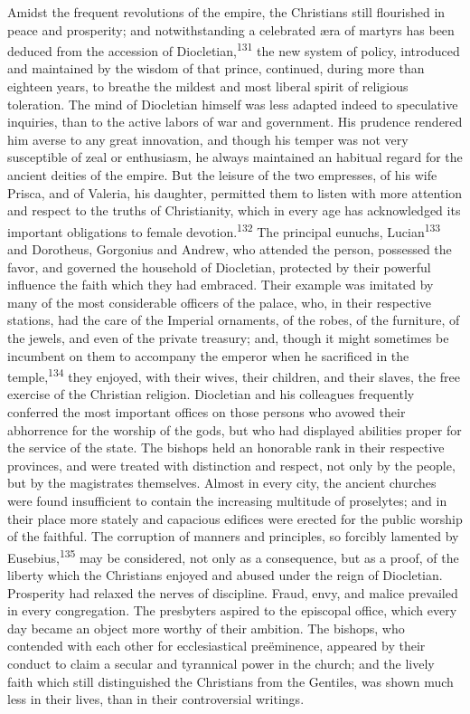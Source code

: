 Amidst the frequent revolutions of the empire, the Christians
still flourished in peace and prosperity; and notwithstanding a
celebrated æra of martyrs has been deduced from the accession of
Diocletian,\textsuperscript{131} the new system of policy, introduced and
maintained by the wisdom of that prince, continued, during more
than eighteen years, to breathe the mildest and most liberal
spirit of religious toleration. The mind of Diocletian himself
was less adapted indeed to speculative inquiries, than to the
active labors of war and government. His prudence rendered him
averse to any great innovation, and though his temper was not
very susceptible of zeal or enthusiasm, he always maintained an
habitual regard for the ancient deities of the empire. But the
leisure of the two empresses, of his wife Prisca, and of Valeria,
his daughter, permitted them to listen with more attention and
respect to the truths of Christianity, which in every age has
acknowledged its important obligations to female devotion.\textsuperscript{132}
The principal eunuchs, Lucian\textsuperscript{133} and Dorotheus, Gorgonius and
Andrew, who attended the person, possessed the favor, and
governed the household of Diocletian, protected by their powerful
influence the faith which they had embraced. Their example was
imitated by many of the most considerable officers of the palace,
who, in their respective stations, had the care of the Imperial
ornaments, of the robes, of the furniture, of the jewels, and
even of the private treasury; and, though it might sometimes be
incumbent on them to accompany the emperor when he sacrificed in
the temple,\textsuperscript{134} they enjoyed, with their wives, their children,
and their slaves, the free exercise of the Christian religion.
Diocletian and his colleagues frequently conferred the most
important offices on those persons who avowed their abhorrence
for the worship of the gods, but who had displayed abilities
proper for the service of the state. The bishops held an
honorable rank in their respective provinces, and were treated
with distinction and respect, not only by the people, but by the
magistrates themselves. Almost in every city, the ancient
churches were found insufficient to contain the increasing
multitude of proselytes; and in their place more stately and
capacious edifices were erected for the public worship of the
faithful. The corruption of manners and principles, so forcibly
lamented by Eusebius,\textsuperscript{135} may be considered, not only as a
consequence, but as a proof, of the liberty which the Christians
enjoyed and abused under the reign of Diocletian. Prosperity had
relaxed the nerves of discipline. Fraud, envy, and malice
prevailed in every congregation. The presbyters aspired to the
episcopal office, which every day became an object more worthy of
their ambition. The bishops, who contended with each other for
ecclesiastical preëminence, appeared by their conduct to claim a
secular and tyrannical power in the church; and the lively faith
which still distinguished the Christians from the Gentiles, was
shown much less in their lives, than in their controversial
writings.

